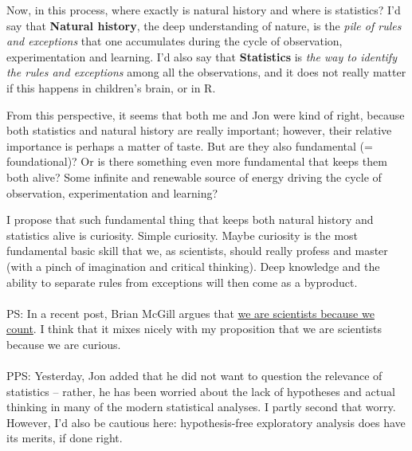 \documentclass[11pt,a4paper]{article}
\begin{document}
Now, in this process, where exactly is natural history and where is statistics? I'd say that \textbf{Natural history}, the deep understanding of nature, is the \textit{pile of rules and exceptions} that one accumulates during the cycle of observation, experimentation and learning. I'd also say that \textbf{Statistics} is \textit{the way to identify the rules and exceptions} among all the observations, and it does not really matter if this happens in children's brain, or in R.

From this perspective, it seems that both me and Jon were kind of right, because both statistics and natural history are really important; however, their relative importance is perhaps a matter of taste. But are they also fundamental (= foundational)? Or is there something even more fundamental that keeps them both alive?  Some infinite and renewable source of energy driving the cycle of observation, experimentation and learning?

I propose that such fundamental thing that keeps both natural history and statistics alive is curiosity. Simple curiosity. Maybe curiosity is the most fundamental basic skill that we, as scientists, should really profess and master (with a pinch of imagination and critical thinking). Deep knowledge and the ability to separate rules from exceptions will then come as a byproduct.
\\\\
PS: In a recent post, Brian McGill argues that \href{https://dynamicecology.wordpress.com/2016/02/29/we-arent-scientists-because-of-our-method-were-scientists-because-we-count/}{we are scientists because we count}. I think that it mixes nicely with my proposition that we are scientists because we are curious.
\\\\
PPS: Yesterday, Jon added that he did not want to question the relevance of statistics -- rather, he has been worried about the lack of hypotheses and actual thinking in many of the modern statistical analyses. I partly second that worry. However, I'd also be cautious here: hypothesis-free exploratory analysis does have its merits, if done right.
\end{document}
